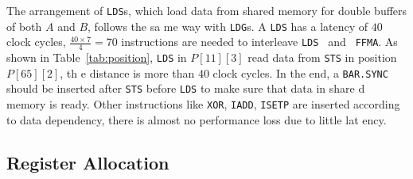 The arrangement of {\tt LDS}s, which load data from shared memory for double buffers of both $A$ and $B$, follows the sa
me way with {\tt LDG}s.
A {\tt LDS} has a latency of $40$ clock cycles, $\frac{40\times 7}{4}=70$ instructions are needed to interleave {\tt LDS
} and {\tt
FFMA}. As shown in Table~\ref{tab:position}, {\tt LDS} in $P[11][3]$ read data from {\tt STS} in position $P[65][2]$, th
e distance is more than $40$ clock
cycles. In the end, a {\tt BAR.SYNC} should be inserted after {\tt STS} before {\tt LDS} to make sure that data in share
d memory is ready. Other instructions like {\tt XOR},
{\tt IADD}, {\tt ISETP} are inserted according to data dependency, there is almost no performance loss due to little lat
ency.


\subsection{Register Allocation}

